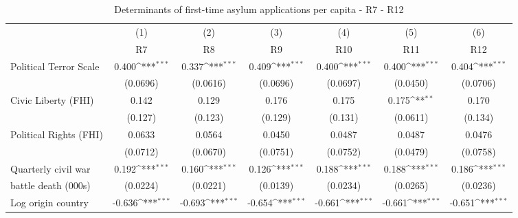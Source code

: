\begin{table}[htbp]\centering \footnotesize
\def\sym#1{\ifmmode^{#1}\else\(^{#1}\)\fi}
\caption{Determinants of first-time asylum applications per capita - R7 - R12}
\begin{tabular}{l*{6}{c}}
\hline\hline
	&\multicolumn{1}{c}{(1)}     &\multicolumn{1}{c}{(2)}       &\multicolumn{1}{c}{(3)}       &\multicolumn{1}{c}{(4)}    	&\multicolumn{1}{c}{(5)}  	&\multicolumn{1}{c}{(6)}   \\
                    &\multicolumn{1}{c}{R7}         &\multicolumn{1}{c}{R8}         &\multicolumn{1}{c}{R9}         &\multicolumn{1}{c}{R10}         &\multicolumn{1}{c}{R11}         &\multicolumn{1}{c}{R12}         \\
\hline
Political Terror Scale	&       0.400\sym{***}& 0.337\sym{***}    &       0.409\sym{***}&       0.400\sym{***}&       0.400\sym{***}&       0.404\sym{***}\\
                    	&    (0.0696)         &     (0.0616)                  &    (0.0696)         &    (0.0697)         &    (0.0450)         &    (0.0706)         \\
[0,5em]
Civic Liberty (FHI) 	&       0.142         &        0.129              &       0.176         &       0.175         &       0.175\sym{**} &       0.170         \\
                    	&     (0.127)         &        (0.123)             &     (0.129)         &     (0.131)         &    (0.0611)         &     (0.134)         \\
[0,5em]
Political Rights (FHI)	&      0.0633         &       0.0564                &      0.0450         &      0.0487         &      0.0487         &      0.0476         \\
                    	&    (0.0712)         &          (0.0670)           &    (0.0751)         &    (0.0752)         &    (0.0479)         &    (0.0758)         \\
[0,5em]
Quarterly civil war 	&       0.192\sym{***}&     0.160\sym{***}          &    0.126\sym{***}                 &       0.188\sym{***}&       0.188\sym{***}&       0.186\sym{***}\\
battle death (000s)     &    (0.0224)         &  (0.0221)                   &     (0.0139)                 &    (0.0234)         &    (0.0265)         &    (0.0236)         \\
[0,5em]
Log origin country 		&      -0.636\sym{***}&   -0.693\sym{***}                  &      -0.654\sym{***}&      -0.661\sym{***}&      -0.661\sym{***}&      -0.651\sym{***}\\

\end{tabular}
\end{table}
